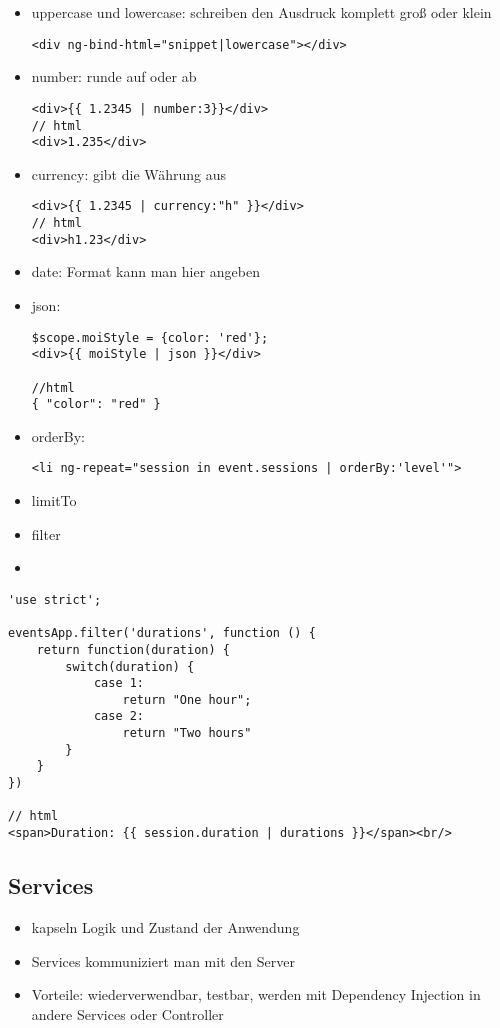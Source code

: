 \begin{itemize}
  \item uppercase und lowercase: schreiben den Ausdruck komplett groß oder klein
    \begin{verbatim}
<div ng-bind-html="snippet|lowercase"></div>
    \end{verbatim}
  \item number: runde auf oder ab
    \begin{verbatim}
<div>{{ 1.2345 | number:3}}</div>
// html
<div>1.235</div>
    \end{verbatim}
  \item currency: gibt die Währung aus
    \begin{verbatim}
<div>{{ 1.2345 | currency:"h" }}</div>
// html
<div>h1.23</div>
    \end{verbatim}
  \item date: Format kann man hier angeben
  \item json:
    \begin{verbatim}
$scope.moiStyle = {color: 'red'};
<div>{{ moiStyle | json }}</div>

//html
{ "color": "red" }
    \end{verbatim}
  \item orderBy:
    \begin{verbatim}
<li ng-repeat="session in event.sessions | orderBy:'level'">
    \end{verbatim}
  \item limitTo
  \item filter
  \item
\end{itemize}


\begin{verbatim}
'use strict';

eventsApp.filter('durations', function () {
    return function(duration) {
        switch(duration) {
            case 1:
                return "One hour";
            case 2:
                return "Two hours"
        }
    }
})

// html
<span>Duration: {{ session.duration | durations }}</span><br/>

\end{verbatim}



\subsection{Services}
\begin{itemize}
  \item kapseln Logik und Zustand der Anwendung
  \item Services kommuniziert man mit den Server
  \item Vorteile: wiederverwendbar, testbar, werden mit Dependency Injection in andere Services oder
    Controller
\end{itemize}


